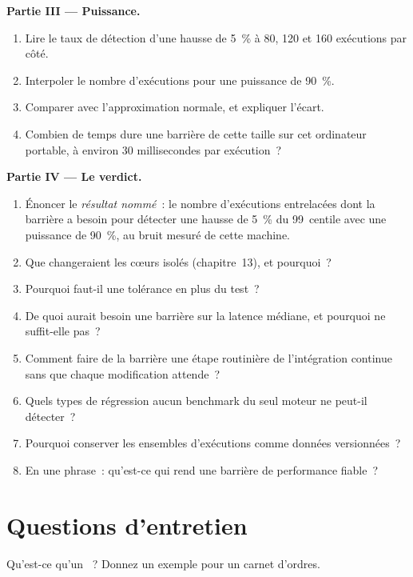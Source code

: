 \begin{problem}
\medskip\noindent\textbf{Partie III --- Puissance.}
\begin{enumerate}[resume]
\item Lire le taux de détection d'une hausse de 5~\% à 80, 120 et 160 exécutions par côté.
\item Interpoler le nombre d'exécutions pour une puissance de 90~\%.
\item Comparer avec l'approximation normale, et expliquer l'écart.
\item Combien de temps dure une barrière de cette taille sur cet ordinateur portable, à environ 30 millisecondes par exécution~?
\end{enumerate}

\medskip\noindent\textbf{Partie IV --- Le verdict.}
\begin{enumerate}[resume]
\item Énoncer le \emph{résultat nommé}~: le nombre d'exécutions entrelacées dont la barrière a besoin pour détecter une hausse de 5~\% du 99~centile
avec une puissance de 90~\%, au bruit mesuré de cette machine.
\item Que changeraient les cœurs isolés (chapitre~13), et pourquoi~?
\item Pourquoi faut-il une tolérance en plus du test~?
\item De quoi aurait besoin une barrière sur la latence médiane, et pourquoi ne suffit-elle pas~?
\item Comment faire de la barrière une étape routinière de l'intégration continue sans que chaque modification attende~?
\item Quels types de régression aucun benchmark du seul moteur ne peut-il détecter~?
\item Pourquoi conserver les ensembles d'exécutions comme données versionnées~?
\item En une phrase~: qu'est-ce qui rend une barrière de performance fiable~?
\end{enumerate}
\end{problem}

\section{Questions d'entretien}

\begin{interviewq}\label{iq:ll:testing-and-deploying-low-latency-systems:1}
Qu'est-ce qu'un ~? Donnez un exemple pour un carnet d'ordres.
\end{interviewq}

